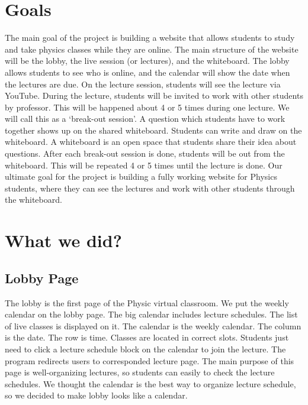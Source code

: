 \documentclass[10pt, letterpaper]{article}
\begin{document}
\section{Goals}
    The main goal of the project is building a website that allows students to study and take physics classes while they are online. The main structure of the website will be the lobby, the live session (or lectures), and the whiteboard. The lobby allows students to see who is online, and the calendar will show the date when the lectures are due. On the lecture session, students will see the lecture via YouTube. During the lecture, students will be invited to work with other students by professor. This will be happened about 4 or 5 times during one lecture. We will call this as a ‘break-out session’. A question which students have to work together shows up on the shared whiteboard. Students can write and draw on the whiteboard. A whiteboard is an open space that students share their idea about questions. After each break-out session is done, students will be out from the whiteboard. This will be repeated 4 or 5 times until the lecture is done. Our ultimate goal for the project is building a fully working website for Physics students, where they can see the lectures and work with other students through the whiteboard. 

\section{What we did?}
    \subsection{Lobby Page}
        The lobby is the first page of the Physic virtual classroom. We put the weekly calendar on the lobby page. The big calendar includes lecture schedules. The list of live classes is displayed on it. The calendar is the weekly calendar. The column is the date. The row is time. Classes are located in correct slots. Students just need to click a lecture schedule block on the calendar to join the lecture. The program redirects users to corresponded lecture page. The main purpose of this page is well-organizing lectures, so students can easily to check the lecture schedules. We thought the calendar is the best way to organize lecture schedule, so we decided to make lobby looks like a calendar.
\end{document}

